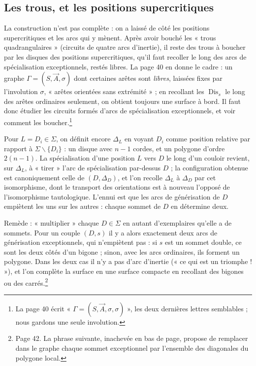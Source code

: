 \documentclass[11pt,a4paper]{article}
\begin{document}
\subsection*{Les trous, et les positions supercritiques}

La construction n'est pas complète : on a laissé de côté les positions
supercritiques et les arcs qui y mènent. Après avoir bouché les « trous
quadrangulaires » (circuits de quatre arcs d'inertie), il reste des trous à
boucher par les disques des positions supercritiques, qu'il faut recoller le
long des arcs de spécialisation exceptionnels, restés libres. La page 40 en
donne le cadre : un graphe $\Gamma = (S, \vec{A}, \sigma)$ dont certaines arêtes
sont \emph{libres}, laissées fixes par l'involution $\sigma$, « arêtes orientées
sans extrémité » ; en recollant les $\operatorname{Dis}_s$ le long des arêtes
ordinaires seulement, on obtient toujours une surface à bord. Il faut donc
étudier les circuits formés d'arcs de spécialisation exceptionnels, et voir
comment les boucher.\footnote{La page 40 écrit « $\Gamma = (S, \vec{A}, \sigma,
\sigma)$ », les deux dernières lettres semblables ; nous gardons une seule
involution.}

Pour $L = D_i \in \Sigma$, on définit encore $\Delta_L$ en voyant $D_i$ comme
position relative par rapport à $\Sigma \smallsetminus \lbrace D_i \rbrace$ : un
disque avec $n - 1$ cordes, et un polygone d'ordre $2(n-1)$. La spécialisation
d'une position $L$ vers $D$ le long d'un couloir revient, sur $\Delta_L$, à
« tirer » l'arc de spécialisation par-dessus $D$ ; la configuration obtenue est
canoniquement celle de $(D, \Delta_D)$, et l'on recolle $\Delta_L$ à $\Delta_D$
par cet isomorphisme, dont le transport des orientations est à nouveau l'opposé
de l'isomorphisme tautologique. L'ennui est que les arcs de générisation de $D$
empiètent les uns sur les autres : chaque sommet de $D$ en détermine deux.

Remède : « multiplier » chaque $D \in \Sigma$ en autant d'exemplaires qu'elle a
de sommets. Pour un couple $(D, s)$ il y a alors exactement deux arcs de
générisation exceptionnels, qui n'empiètent pas : si $s$ est un sommet double,
ce sont les deux côtés d'un bigone ; sinon, avec les arcs ordinaires, ils
forment un polygone. Dans les deux cas il n'y a pas d'arc d'inertie (« ce qui
est un triomphe ! »), et l'on complète la surface en une surface compacte en
recollant des bigones ou des carrés.\footnote{Page 42. La phrase suivante,
inachevée en bas de page, propose de remplacer dans le graphe chaque sommet
exceptionnel par l'ensemble des diagonales du polygone local.}
\end{document}
